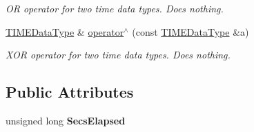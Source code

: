 \begin{DoxyCompactItemize}
\begin{DoxyCompactList}\small\item\em OR operator for two time data types. Does nothing. \end{DoxyCompactList}\item 
\hyperlink{structpc__emulator_1_1TIMEDataType}{T\+I\+M\+E\+Data\+Type} \& \hyperlink{structpc__emulator_1_1TIMEDataType_acc18b8892a0428578d50171003f791a0}{operator$^\wedge$} (const \hyperlink{structpc__emulator_1_1TIMEDataType}{T\+I\+M\+E\+Data\+Type} \&a)\hypertarget{structpc__emulator_1_1TIMEDataType_acc18b8892a0428578d50171003f791a0}{}\label{structpc__emulator_1_1TIMEDataType_acc18b8892a0428578d50171003f791a0}

\begin{DoxyCompactList}\small\item\em X\+OR operator for two time data types. Does nothing. \end{DoxyCompactList}\end{DoxyCompactItemize}
\subsection*{Public Attributes}
\begin{DoxyCompactItemize}
\item 
unsigned long {\bfseries Secs\+Elapsed}\hypertarget{structpc__emulator_1_1TIMEDataType_a846eaae96e50db00b6a589be093b9354}{}\label{structpc__emulator_1_1TIMEDataType_a846eaae96e50db00b6a589be093b9354}

\end{DoxyCompactItemize}
